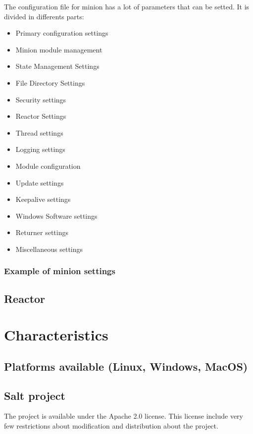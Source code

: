\documentclass[12pt,a4paper,openright,twoside]{book}
\begin{document}
The configuration file for minion has a lot of parameters that can be setted.
It is divided in differents parts:
\begin{itemize}
    \item Primary configuration settings
    \item Minion module management
    \item State Management Settings
    \item File Directory Settings
    \item Security settings
    \item Reactor Settings
    \item Thread settings
    \item Logging settings
    \item Module configuration
    \item Update settings
    \item Keepalive settings
    \item Windows Software settings
    \item Returner settings
    \item Miscellaneous settings
    \end{itemize}

\subsubsection{Example of minion settings}





\subsection{Reactor}


\section{Characteristics}

\subsection{Platforms available (Linux, Windows, MacOS)}

\subsection{Salt project}
The project is available under the Apache 2.0 license.
This license include very few restrictions about modification and distribution about the project.
\end{document}
